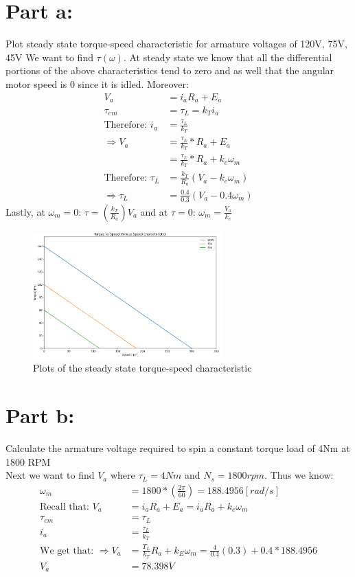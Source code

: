 \documentclass{article}
\begin{document}
\section*{Part a:}
Plot steady state torque-speed characteristic for armature voltages of 120V, 75V, 45V
We want to find $\tau(\omega)$. At steady state we know that all the differential portions of the above characteristics tend to zero and as well that the angular motor speed is 0 since it is idled. Moreover:
\begin{align*}
    V_a &= i_a R_a + E_a\\
    \tau_{em} &= \tau_L = k_T i_a\\
    \mbox{Therefore: } i_a &= \frac{\tau_L}{k_T}\\
    \Longrightarrow V_a &= \frac{\tau_L}{k_T}*R_a + E_a \\
    &= \frac{\tau_L}{k_T}*R_a + k_e\omega_m\\
    \mbox{Therefore: } \tau_L &= \frac{k_T}{R_a}(V_a - k_e \omega_m)\\
    \Longrightarrow \tau_L &= \frac{0.4}{0.3}(V_a - 0.4 \omega_m)
\end{align*}
Lastly, at $\omega_m = 0$: $\tau = (\frac{k_T}{R_a})V_a$ and at $\tau=0$: $\omega_m = \frac{V_a}{k_e}$\\
\begin{figure}[H]
    \centering
    \includegraphics[width=0.65\textwidth]{q1-a.png}
    \caption{Plots of the steady state torque-speed characteristic}
\end{figure}
 
\section*{Part b:}
Calculate the armature voltage required to spin a constant torque load of 4Nm at 1800 RPM\\
Next we want to find $V_a$ where $\tau_L = 4Nm$ and $N_s = 1800rpm$. Thus we know:
\begin{align*}
    \omega_m &= 1800 * (\frac{2\pi}{60}) = 188.4956 [rad/s]\\
    \mbox{Recall that: } V_a &= i_a R_a + E_a = i_a R_a + k_e \omega_m \\
    \tau_{em} &= \tau_L\\
    i_a &= \frac{\tau_L}{k_T}\\
    \mbox{We get that: } \Longrightarrow V_a &= \frac{T_L}{k_T}R_a + k_E \omega_m = \frac{4}{0.4}(0.3) + 0.4*188.4956 \\
    V_a &= 78.398V
\end{align*}
\end{document}
